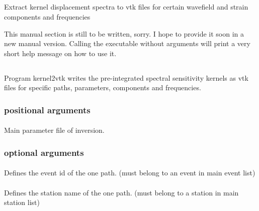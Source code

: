 \subsection{} \label{programs_scripts,sec:bin_prog,sec:kdispl_2_vtk}
Extract kernel displacement spectra to vtk files for certain wavefield and strain components and frequencies

This manual section is still to be written, sorry. I hope to provide it soon in a new manual version. %
Calling the executable without arguments will print a very short help message on how to use it.
%
%
\subsection{} \label{programs_scripts,sec:bin_prog,sec:kernel_2_vtk}
Program kernel2vtk writes the pre-integrated spectral sensitivity kernels as vtk files for specific paths, parameters, components and frequencies.
\subsubsection{positional arguments}
\paragraph{}
Main parameter file of inversion.
\subsubsection{optional arguments}
\paragraph{ }
Defines the event id of the one path. (must belong to an event in main event list)
\paragraph{ }
Defines the station name of the one path. (must belong to a station in main station list)
